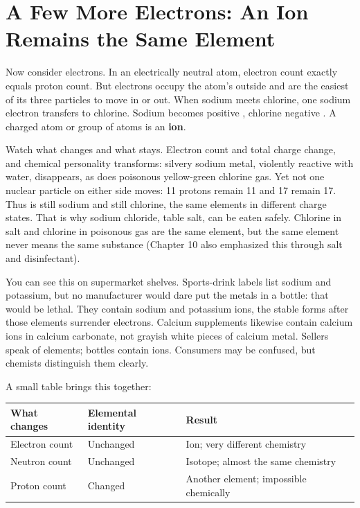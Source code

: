 \section{A Few More Electrons: An Ion Remains the Same Element}

Now consider electrons. In an electrically neutral atom, electron count exactly equals proton count. But electrons occupy the atom's outside and are the easiest of its three particles to move in or out. When sodium meets chlorine, one sodium electron transfers to chlorine. Sodium becomes positive , chlorine negative . A charged atom or group of atoms is an \textbf{ion}.

Watch what changes and what stays. Electron count and total charge change, and chemical personality transforms: silvery sodium metal, violently reactive with water, disappears, as does poisonous yellow-green chlorine gas. Yet not one nuclear particle on either side moves: 11 protons remain 11 and 17 remain 17. Thus  is still sodium and  still chlorine, the same elements in different charge states. That is why sodium chloride, table salt, can be eaten safely. Chlorine in salt and chlorine in poisonous gas are the same element, but the same element never means the same substance (Chapter 10 also emphasized this through salt and disinfectant).

You can see this on supermarket shelves. Sports-drink labels list sodium and potassium, but no manufacturer would dare put the metals in a bottle: that would be lethal. They contain sodium and potassium ions, the stable forms after those elements surrender electrons. Calcium supplements likewise contain calcium ions in calcium carbonate, not grayish white pieces of calcium metal. Sellers speak of elements; bottles contain ions. Consumers may be confused, but chemists distinguish them clearly.

A small table brings this together:

\begin{table}[htbp]
\centering
\begin{tabular}{lll}
\toprule
What changes & Elemental identity & Result \\
\midrule
Electron count & Unchanged & Ion; very different chemistry \\
Neutron count & Unchanged & Isotope; almost the same chemistry \\
Proton count & Changed & Another element; impossible chemically \\
\bottomrule
\end{tabular}
\end{table}

